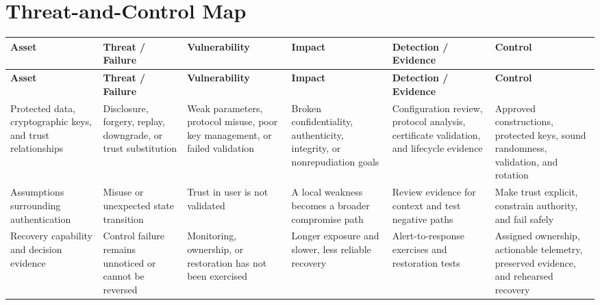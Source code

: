 \documentclass[11pt]{article}
\begin{document}
\section*{Threat-and-Control Map}
\begingroup\scriptsize\setlength{\tabcolsep}{2pt}
\begin{longtable}{>{\RaggedRight\arraybackslash}p{}>{\RaggedRight\arraybackslash}p{}>{\RaggedRight\arraybackslash}p{}>{\RaggedRight\arraybackslash}p{}>{\RaggedRight\arraybackslash}p{}>{\RaggedRight\arraybackslash}p{}}
\toprule\rowcolor{Navy}\color{white}\textbf{Asset} & \color{white}\textbf{Threat / Failure} & \color{white}\textbf{Vulnerability} & \color{white}\textbf{Impact} & \color{white}\textbf{Detection / Evidence} & \color{white}\textbf{Control}\\\midrule
\endfirsthead
\toprule\rowcolor{Navy}\color{white}\textbf{Asset} & \color{white}\textbf{Threat / Failure} & \color{white}\textbf{Vulnerability} & \color{white}\textbf{Impact} & \color{white}\textbf{Detection / Evidence} & \color{white}\textbf{Control}\\\midrule
\endhead
Protected data, cryptographic keys, and trust relationships & Disclosure, forgery, replay, downgrade, or trust substitution & Weak parameters, protocol misuse, poor key management, or failed validation & Broken confidentiality, authenticity, integrity, or nonrepudiation goals & Configuration review, protocol analysis, certificate validation, and lifecycle evidence & Approved constructions, protected keys, sound randomness, validation, and rotation\\\midrule
Assumptions surrounding authentication & Misuse or unexpected state transition & Trust in user is not validated & A local weakness becomes a broader compromise path & Review evidence for context and test negative paths & Make trust explicit, constrain authority, and fail safely\\\midrule
Recovery capability and decision evidence & Control failure remains unnoticed or cannot be reversed & Monitoring, ownership, or restoration has not been exercised & Longer exposure and slower, less reliable recovery & Alert-to-response exercises and restoration tests & Assigned ownership, actionable telemetry, preserved evidence, and rehearsed recovery\\\midrule
\bottomrule
\end{longtable}
\endgroup
\end{document}
